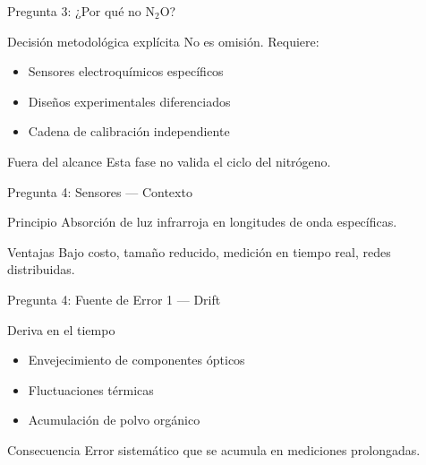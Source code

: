 \documentclass[aspectratio=169, 11pt]{beamer}
\newcommand{\NDIR}{\text{NDIR}}
\begin{document}
\begin{frame}{Pregunta 3: ¿Por qué no N$_2$O?}
\begin{block}{Decisión metodológica explícita}
\footnotesize
No es omisión. Requiere:
\begin{itemize}
    \item Sensores electroquímicos específicos
    \item Diseños experimentales diferenciados
    \item Cadena de calibración independiente
\end{itemize}
\end{block}
\begin{alertblock}{Fuera del alcance}
\footnotesize
Esta fase no valida el ciclo del nitrógeno.
\end{alertblock}
\end{frame}

\begin{frame}{Pregunta 4: Sensores \NDIR{} --- Contexto}
\begin{block}{Principio}
\footnotesize
Absorción de luz infrarroja en longitudes de onda específicas.
\end{block}
\begin{exampleblock}{Ventajas}
\footnotesize
Bajo costo, tamaño reducido, medición en tiempo real, redes distribuidas.
\end{exampleblock}
\end{frame}

\begin{frame}{Pregunta 4: Fuente de Error 1 --- Drift}
\begin{alertblock}{Deriva en el tiempo}
\footnotesize
\begin{itemize}
    \item Envejecimiento de componentes ópticos
    \item Fluctuaciones térmicas
    \item Acumulación de polvo orgánico
\end{itemize}
\end{alertblock}
\begin{block}{Consecuencia}
\footnotesize
Error sistemático que se acumula en mediciones prolongadas.
\end{block}
\end{frame}
\end{document}
